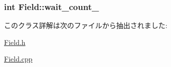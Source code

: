 \hypertarget{class_field_a20e399af0fc61f66c5b0a7aadcb5e10b}{
\subsubsection[{wait\+\_\+count\+\_\+}]{\setlength{\rightskip}{0pt plus 5cm}int Field\+::wait\+\_\+count\+\_\+\hspace{0.3cm}{\ttfamily [private]}}}\label{class_field_a20e399af0fc61f66c5b0a7aadcb5e10b}


このクラス詳解は次のファイルから抽出されました\+:\begin{DoxyCompactItemize}
\item 
\hyperlink{_field_8h}{Field.\+h}\item 
\hyperlink{_field_8cpp}{Field.\+cpp}\end{DoxyCompactItemize}
